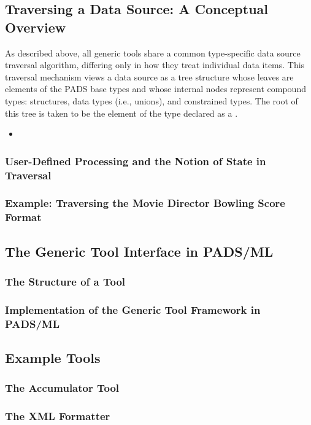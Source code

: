 \subsection{Traversing a Data Source: A Conceptual Overview}
\label{sec:gen-tool-traversal}
As described above, all generic tools share a common type-specific data source traversal algorithm, differing only in how they treat individual data items. This traversal mechanism views a data source as a tree structure whose leaves are elements of the PADS base types and whose internal nodes represent compound types: structures, data types (i.e., unions), and constrained types. The root of this tree is taken to be the element of the type declared as a .

\begin{itemize}
\item 
\end{itemize}

\subsubsection{User-Defined Processing and the Notion of State in Traversal}
\label{sec:gen-tool-traversal-state}

\subsubsection{Example: Traversing the Movie Director Bowling Score Format}
\label{sec:gen-tool-traversal-mbs}

\subsection{The Generic Tool Interface in PADS/ML}
\label{sec:gen-tool-interface}

\subsubsection{The Structure of a Tool}
\label{sec:gen-tool-interface-tool-struct}

\subsubsection{Implementation of the Generic Tool Framework in PADS/ML}
\label{sec:gen-tool-interface-implementation}

\subsection{Example Tools}
\label{sec:gen-tool-examples}

\subsubsection{The Accumulator Tool}
\label{sec:gen-tool-examples-acc}

\subsubsection{The XML Formatter}
\label{sec:gen-tool-examples-xml}

